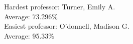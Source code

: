 
Hardest professor: Turner, Emily A.\\
Average: 73.296\%\\

Easiest professor: O'donnell, Madison G.\\
Average: 95.33\%